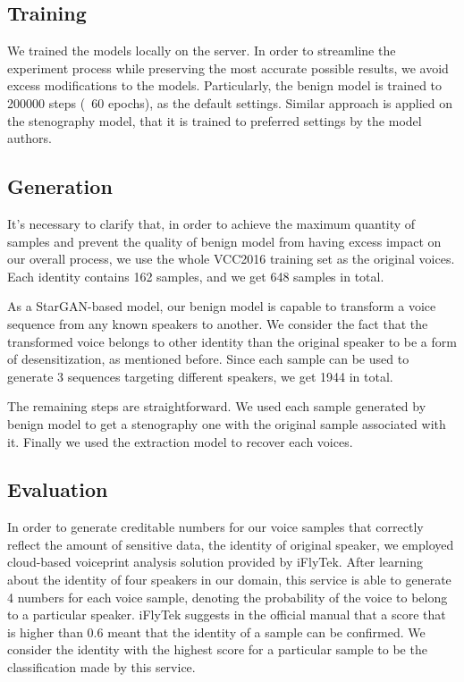 \documentclass[journal]{IEEEtran} %
\begin{document}
\subsection{Training}

We trained the models locally on the server. In order to streamline the experiment process while preserving the most accurate possible results, we avoid excess modifications to the models. Particularly, the benign model is trained to 200000 steps (~60 epochs), as the default settings. Similar approach is applied on the stenography model, that it is trained to preferred settings by the model authors.

\subsection{Generation}

It's necessary to clarify that, in order to achieve the maximum quantity of samples and prevent the quality of benign model from having excess impact on our overall process, we use the whole VCC2016 training set as the original voices. Each identity contains 162 samples, and we get 648 samples in total.

As a StarGAN-based model, our benign model is capable to transform a voice sequence from any known speakers to another. We consider the fact that the transformed voice belongs to other identity than the original speaker to be a form of desensitization, as mentioned before. Since each sample can be used to generate 3 sequences targeting different speakers, we get 1944 in total.

The remaining steps are straightforward. We used each sample generated by benign model to get a stenography one with the original sample associated with it. Finally we used the extraction model to recover each voices.

\subsection{Evaluation}

In order to generate creditable numbers for our voice samples that correctly reflect the amount of sensitive data, the identity of original speaker, we employed cloud-based voiceprint analysis solution provided by iFlyTek. After learning about the identity of four speakers in our domain, this service is able to generate 4 numbers for each voice sample, denoting the probability of the voice to belong to a particular speaker. iFlyTek suggests in the official manual that a score that is higher than 0.6 meant that the identity of a sample can be confirmed. We consider the identity with the highest score for a particular sample to be the classification made by this service.
\end{document}
